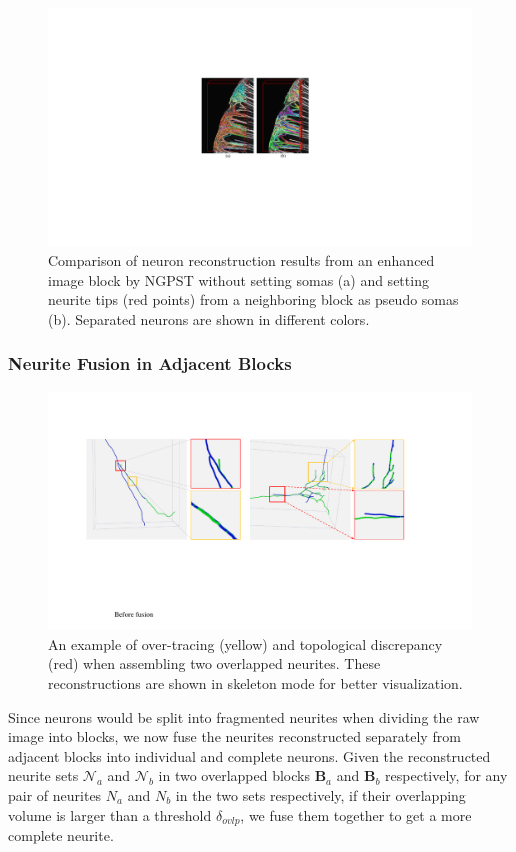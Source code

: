 \begin{figure}[t]
	\centering
	\includegraphics[width=0.85\columnwidth]{./Illustrations/ngpst_pseudosoma.pdf}
	\caption{Comparison of neuron reconstruction results from an enhanced image block by NGPST without setting somas (a) and setting neurite tips (red points) from a neighboring block as pseudo somas (b). Separated neurons are shown in different colors.}
	\label{fig:ngpst_pseudosoma}
\end{figure}



\subsubsection{Neurite Fusion in Adjacent Blocks}
\label{sec:fusion}


\begin{figure}[b]
	\centering
	\includegraphics[width=0.86\columnwidth]{./Illustrations/fusion_errors.pdf}
	\caption{An example of over-tracing (yellow) and topological discrepancy (red) when assembling two overlapped neurites. These reconstructions are shown in skeleton mode for better visualization.}
	\label{fig:overlap_discrepancy}
\end{figure}
Since neurons would be split into fragmented neurites when dividing the raw image into blocks, we now fuse the neurites reconstructed separately from adjacent blocks into individual and complete neurons.
Given the reconstructed neurite sets $\mathcal{N}_a$ and $\mathcal{N}_b$ in two overlapped blocks $\mathbf{B}_a$ and $\mathbf{B}_b$ respectively, for any pair of neurites $N_a$ and $N_b$ in the two sets respectively, if their overlapping volume is larger than a threshold $\delta_{ovlp}$, we fuse them together to get a more complete neurite.

